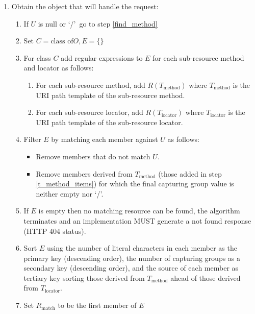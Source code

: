 \begin{enumerate}
\begin{enumerate}
\end{enumerate}

\item \label{find_object} Obtain the object that will handle the request:

\begin{enumerate}
\item \label{check_null} If $U$ is null or \lq/\rq\ go to step \ref{find_method}

\item Set $C=\mbox{class of} O, E=\{\}$

\item For class $C$ add regular expressions to $E$ for each sub-resource method and locator as follows:
\begin{enumerate}
\item \label{t_method_items} For each sub-resource method, add $R(T_{\mbox{method}})$ where $T_{\mbox{method}}$ is the URI path template of the sub-resource method.
\item For each sub-resource locator, add $R(T_{\mbox{locator}})$ where $T_{\mbox{locator}}$ is the  URI path template of the sub-resource locator.
\end{enumerate}

\item Filter $E$ by matching each member against $U$ as follows:
\begin{itemize}
\item Remove members that do not match $U$.
\item Remove members derived from $T_{\mbox{method}}$ (those added in step \ref{t_method_items}) for which the final capturing group value is neither empty nor \lq/\rq.
\end{itemize}

\item If $E$ is empty then no matching resource can be found, the algorithm terminates and an implementation MUST generate a not found response (HTTP 404 status).

\item Sort $E$ using the number of literal characters in each member as the primary key (descending order), the number of capturing groups as a secondary key (descending order), and the source of each member as tertiary key sorting those derived from $T_{\mbox{method}}$ ahead of those derived from $T_{\mbox{locator}}$.

\item Set $R_{\mbox{match}}$ to be the first member of $E$


\end{enumerate}
\end{enumerate}
